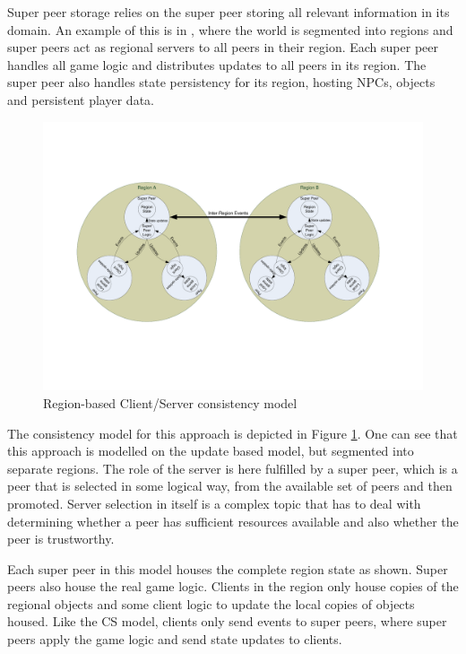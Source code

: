\documentclass[10pt,a4paper,journal,cspaper,compsoc]{IEEEtran}
\begin{document}
Super peer storage relies on the super peer storing all relevant information in its domain. An example of this is in \cite{knutsson_p2p_first}, where
the world is segmented into regions and super peers act as regional servers to all peers in their region. Each super peer handles all game logic and
distributes updates to all peers in its region. The super peer also handles state persistency for its region, hosting NPCs, objects and persistent
player data.

\begin{figure}[htbp]
 \centering
 \includegraphics[clip=true, viewport=2cm 5cm 27cm 16.5cm, width=\textwidth]{region_based_CS_CM}
 \caption{Region-based Client/Server consistency model}
 \label{fig_cs_region_cm}
\end{figure}
%
The consistency model for this approach is depicted in Figure \ref{fig_cs_region_cm}. One can see that this approach is modelled on the update based
model, but segmented into separate regions. The role of the server is here fulfilled by a super peer, which is a peer that is selected in some
logical way, from the available set of peers and then promoted. Server selection in itself is a complex topic that has to deal with determining
whether a peer has sufficient resources available and also whether the peer is trustworthy.

Each super peer in this model houses the complete region state as shown. Super peers also house the real game logic. Clients in the region only house
copies of the regional objects and some client logic to update the local copies of objects housed. Like the \ac{CS} model, clients only send events
to super peers, where super peers apply the game logic and send state updates to clients.
\end{document}
